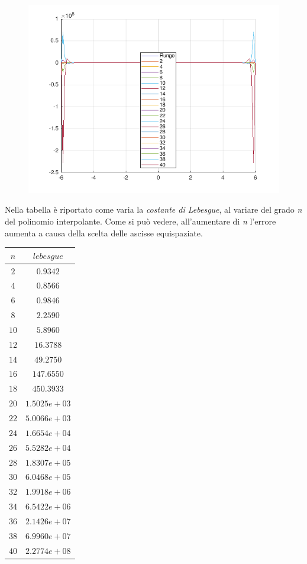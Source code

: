 \begin{figure}[H]
	\includegraphics[height=0.6\textwidth,width=\textwidth]{Codici/Cap4/es9(n40)}
\end{figure}

Nella tabella è riportato come varia la \textit{costante di Lebesgue}, al variare del grado \textit{n} del polinomio interpolante. Come si può vedere, all'aumentare di \textit{n} l'errore aumenta a causa della scelta delle ascisse equispaziate.

\begin{center}
	\begin{tabular}{|c|c|}
		\hline
		$n$ & $lebesgue$ \\
		\hline
		$2$  & $0.9342$ \\ 
		$4$  & $0.8566$ \\ 
		$6$  & $0.9846$ \\ 
		$8$  & $2.2590$ \\ 
		$10$ & $5.8960$ \\ 
		$12$ & $16.3788$ \\ 
		$14$ & $49.2750$ \\ 
		$16$ & $147.6550$ \\ 
		$18$ & $450.3933$ \\ 
		$20$ & $1.5025e+03$ \\ 
		$22$ & $5.0066e+03$ \\ 
		$24$ & $1.6654e+04$ \\ 
		$26$ & $5.5282e+04$ \\ 
		$28$ & $1.8307e+05$ \\ 
		$30$ & $6.0468e+05$ \\ 
		$32$ & $1.9918e+06$ \\ 
		$34$ & $6.5422e+06$ \\ 
		$36$ & $2.1426e+07$ \\ 
		$38$ & $6.9960e+07$ \\ 
		$40$ & $2.2774e+08$ \\ 
		\hline
	\end{tabular}
\end{center}